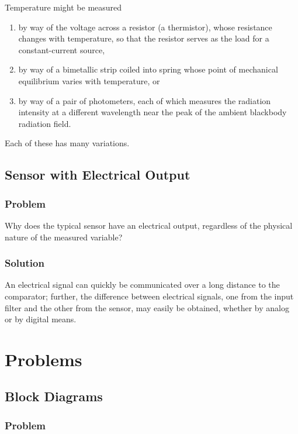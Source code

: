 Temperature might be measured
\begin{enumerate}
   \item by way of the voltage across a resistor (a thermistor), whose
      resistance changes with temperature, so that the resistor serves as the
      load for a constant-current source,
   \item by way of a bimetallic strip coiled into spring whose point of
      mechanical equilibrium varies with temperature, or
   \item by way of a pair of photometers, each of which measures the radiation
      intensity at a different wavelength near the peak of the ambient
      blackbody radiation field.
\end{enumerate}
Each of these has many variations.

\subsection{Sensor with Electrical Output}

\subsubsection{Problem}

Why does the typical sensor have an electrical output, regardless of the
physical nature of the measured variable?

\subsubsection{Solution}

An electrical signal can quickly be communicated over a long distance to the
comparator; further, the difference between electrical signals, one from the
input filter and the other from the sensor, may easily be obtained, whether by
analog or by digital means.

\section{Problems}

\subsection{Block Diagrams}

\subsubsection{Problem}

